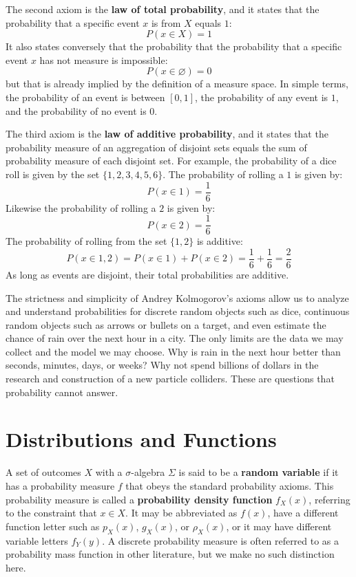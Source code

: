\documentclass[10pt, a5paper, twoside, openright]{memoir}
\begin{document}
The second axiom is the \textbf{law of total probability}, and it states that the probability that a specific event $x$ is from $X$ equals $1$:
$$P(x \in X) = 1$$
It also states conversely that the probability that the probability that a specific event $x$ has not measure is impossible:
$$P(x \in \varnothing) = 0$$
but that is already implied by the definition of a measure space. In simple terms, the probability of an event is between $[0,1]$, the probability of any event is $1$, and the probability of no event is $0$.

The third axiom is the \textbf{law of additive probability}, and it states that the probability measure of an aggregation of disjoint sets equals the sum of probability measure of each disjoint set. For example, the probability of a dice roll is given by the set $\{1, 2, 3, 4, 5, 6\}$.
The probability of rolling a $1$ is given by:
$$P(x \in {1}) = \frac{1}{6}$$
Likewise the probability of rolling a $2$ is given by:
$$P(x \in {2}) = \frac{1}{6}$$
The probability of rolling from the set $\{1, 2\}$ is additive:
$$P(x \in {1, 2}) = P(x \in {1}) + P(x \in {2}) = \frac{1}{6} + \frac{1}{6} = \frac{2}{6}$$
As long as events are disjoint, their total probabilities are additive.

The strictness and simplicity of Andrey Kolmogorov's axioms allow us to analyze and understand probabilities for discrete random objects such as dice, continuous random objects such as arrows or bullets on a target, and even estimate the chance of rain over the next hour in a city. The only limits are the data we may collect and the model we may choose. Why is rain in the next hour better than seconds, minutes, days, or weeks? Why not spend billions of dollars in the research and construction of a new particle colliders. These are questions that probability cannot answer.

\section{Distributions and Functions}
A set of outcomes $X$ with a $\sigma$-algebra $\Sigma$ is said to be a \textbf{random variable} if it has a probability measure $f$ that obeys the standard probability axioms. This probability measure is called a \textbf{probability density function} $f_X(x)$, referring to the constraint that $x \in X$. It may be abbreviated as $f(x)$, have a different function letter such as $p_X(x)$, $g_X(x)$, or $\rho_X(x)$, or it may have different variable letters $f_Y(y)$. A discrete probability measure is often referred to as a probability mass function in other literature, but we make no such distinction here.
\end{document}
